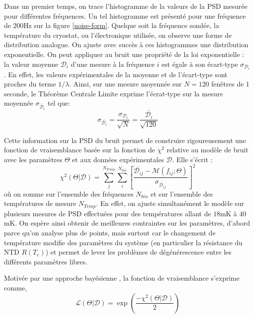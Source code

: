 Dans un premier temps, on trace l'histogramme de la valeurs de la PSD mesurée pour différentes fréquences. Un tel histogramme est présenté pour une fréquence de $200$Hz sur la figure \ref{noise-form}. Quelque soit la fréquence sondée, la température du cryostat, ou l'électronique utilisée, on observe une forme de distribution analogue. On ajuste avec succès à ces histogrammes une distribution exponentielle. On peut appliquer au bruit une propriété de la loi exponentielle : la valeur moyenne $\mathcal{D}_i$ d'une mesure à la fréquence $i$ est égale à son écart-type $\sigma_{\mathcal{D}_i}$. En effet, les valeurs expérimentales de la moyenne et de l'écart-type sont proches du terme $1/\lambda$.
Ainsi, sur une mesure moyennée sur $N=120$ fenêtres de $1$ seconde, le Théorème Centrale Limite exprime l'écrat-type sur la mesure moyennée $\sigma_{\bar{\mathcal{D}}_i}$ tel que:
\begin{equation}
\label{sigma}
\sigma_{\bar{\mathcal{D}_i}} = \frac{\sigma_{\mathcal{D}_i}}{\sqrt{N}} = \frac{\bar{\mathcal{D}_i}}{\sqrt{120}}
\end{equation}

Cette information sur la PSD du bruit permet de construire rigoureusement une fonction de vraisemblance basée sur la fonction de $\chi^2$ relative au modèle de bruit avec les paramètres $\Theta$ et aux données expérimentales $\mathcal{D}$. Elle s'écrit :
\begin{equation}
\label{chi2}
\chi ^2 (\Theta|\mathcal{D}) = \sum^{N_{Temp}}_{j} \sum^{N_{bin}}_{i} \left[ \frac{\bar{\mathcal{D}_{ij}} - \mathcal{M}(f_{ij}; \Theta)}{\sigma_{\bar{\mathcal{D}_{ij}}}} \right]^2
\end{equation}
où on somme sur l'ensemble des fréquences $N_{bin}$ et sur l'ensemble des températures de mesure $N_{Temp}$. En effet, on ajuste simultanément le modèle sur plusieurs mesures de PSD effectuées pour des températures allant de $18$mK à $40$mK. On espère ainsi obtenir de meilleures contraintes sur les paramètres, d'abord parce qu'on analyse plus de points, mais surtout car le changement de température modifie des paramètres du système (en particulier la résistance du NTD $R(T_e)$) et permet de lever les problèmes de dégénérescence entre les différents paramètres libres.

Motivée par une approche bayésienne \cite{julien}, la fonction de vraisemblance s'exprime comme,
\begin{equation}
\label{likelihood}
\mathcal{L}(\Theta | \mathcal{D}) = \exp{\left(\frac{-\chi ^2 (\Theta|\mathcal{D})}{2}\right)}
\end{equation}


